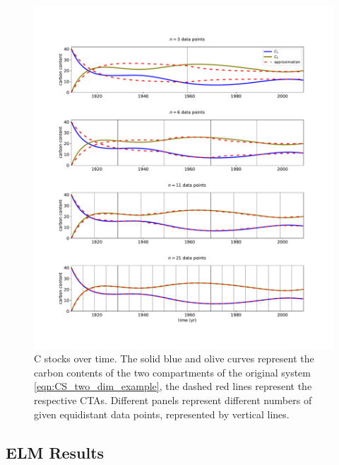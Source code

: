 \documentclass[11pt,a4paper]{article}
\begin{document}
    \begin{figure}[htbp]
        \centering 
        \includegraphics[width=1.0\linewidth]{figs/interpol_pwc_2.pdf}
        \caption{C stocks over time.
            The solid blue and olive curves represent the carbon contents of the two compartments of the original system \eqref{eqn:CS_two_dim_example}, the dashed red lines represent the respective CTAs.
            Different panels represent different numbers of given equidistant data points, represented by vertical lines.
            }
        \label{fig:CS_two_dim_example}
    \end{figure}        

\subsection{ELM Results}

\end{document}
